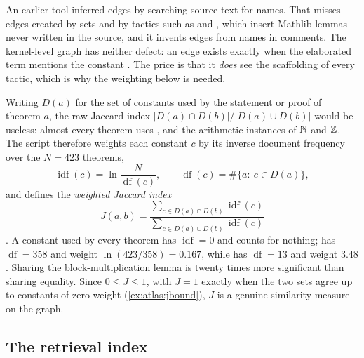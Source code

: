 \begin{pitfallbox}
An earlier tool inferred edges by searching source text for names. That misses edges
created by  sets and by tactics such as  and ,
which insert Mathlib lemmas never written in the source, and it invents edges from names
in comments. The kernel-level graph has neither defect: an edge exists exactly when the
elaborated term mentions the constant . The price
is that it \emph{does} see the scaffolding of every tactic, which is why the weighting
below is needed.
\end{pitfallbox}

Writing $D(a)$ for the set of constants used by the statement or proof of theorem $a$,
the raw Jaccard index $|D(a)\cap D(b)|/|D(a)\cup D(b)|$ would be useless: almost every
theorem uses ,  and the arithmetic instances of $\mathbb{N}$ and $\mathbb{Z}$.
The script therefore weights each constant $c$ by its inverse document frequency over the
$N=423$ theorems,
\begin{equation}\label{eq:atlas:idf}
  \operatorname{idf}(c)=\ln\frac{N}{\operatorname{df}(c)},\qquad
  \operatorname{df}(c)=\#\{a:\ c\in D(a)\},
\end{equation}
and defines the \emph{weighted Jaccard index}
\begin{equation}\label{eq:atlas:wjacc}
  J(a,b)=\frac{\sum_{c\in D(a)\cap D(b)}\operatorname{idf}(c)}
              {\sum_{c\in D(a)\cup D(b)}\operatorname{idf}(c)}
\end{equation}
. A constant used by every theorem has
$\operatorname{idf}=0$ and counts for nothing;  has
$\operatorname{df}=358$ and weight $\ln(423/358)=0.167$, while
 has $\operatorname{df}=13$ and weight $3.48$. Sharing
the block-multiplication lemma is twenty times more significant than sharing equality.
Since $0\le J\le1$, with $J=1$ exactly when the two sets agree up to constants of zero
weight (\cref{ex:atlas:jbound}), $J$ is a genuine similarity measure on the graph.

\subsection{The retrieval index}

